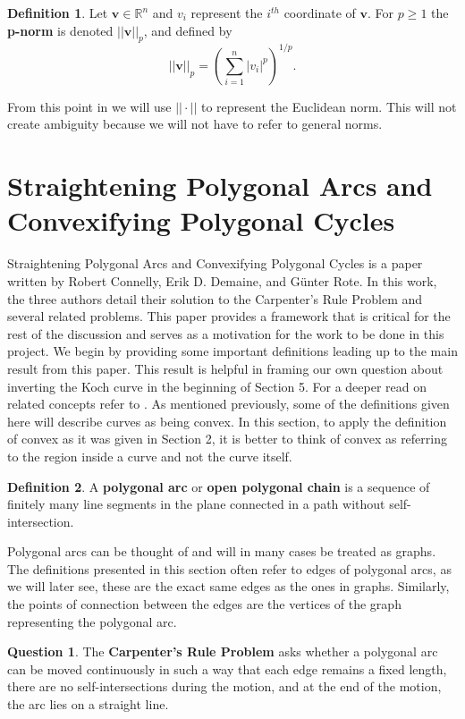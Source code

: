 \documentclass{article}
\theoremstyle{definition}
\newtheorem{definition}{Definition}[section]
\newtheorem{question}{Question}[section]
\begin{document}
\begin{definition}
    Let $\mathbf{v} \in \mathbb{R}^n$ and $v_i$ represent the $i^{th}$ coordinate of $\mathbf{v}$. For $p \geq 1$ the \textbf{p-norm} is denoted $||\mathbf{v}||_p$, and defined by
    $$||\mathbf{v}||_p = \left( \sum_{i = 1}^n|v_i|^p \right)^{1/p}.$$
\end{definition}
\noindent From this point in we will use $||\cdot||$ to represent the Euclidean norm. This will not create ambiguity because we will not have to refer to general norms.
\section{Straightening Polygonal Arcs and Convexifying Polygonal Cycles}
Straightening Polygonal Arcs and Convexifying Polygonal Cycles is a paper written by Robert Connelly, Erik D. Demaine, and G\"unter Rote. In this work, the three authors detail their solution to the Carpenter's Rule Problem and several related problems. This paper provides a framework that is critical for the rest of the discussion and serves as a motivation for the work to be done in this project. We begin by providing some important definitions leading up to the main result from this paper. This result is helpful in framing our own question about inverting the Koch curve in the beginning of Section 5. For a deeper read on related concepts refer to \cite{892131}. As mentioned previously, some of the definitions given here will describe curves as being convex. In this section, to apply the definition of convex as it was given in Section 2, it is better to think of convex as referring to the region inside a curve and not the curve itself.
\begin{definition}
    A \textbf{polygonal arc} or \textbf{open polygonal chain} is a sequence of finitely many line segments in the plane connected in a path without self-intersection.
\end{definition}
\noindent Polygonal arcs can be thought of and will in many cases be treated as graphs. The definitions presented in this section often refer to edges of polygonal arcs, as we will later see, these are the exact same edges as the ones in graphs. Similarly, the points of connection between the edges are the vertices of the graph representing the polygonal arc.
\begin{question}
    The \textbf{Carpenter's Rule Problem} asks whether a polygonal arc can be moved continuously in such a way that each edge remains a fixed length, there are no self-intersections during the motion, and at the end of the motion, the arc lies on a straight line.
\end{question}
\end{document}
